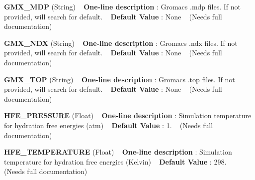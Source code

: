 \begin{DoxyItemize}
\item {\bfseries  G\+M\+X\+\_\+\+M\+DP } (String) ~\newline
{\bfseries  One-\/line description }\+: Gromacs .mdp files. If not provided, will search for default. ~\newline
{\bfseries  Default Value }\+: None ~\newline
(Needs full documentation)\end{DoxyItemize}
\begin{DoxyItemize}
\item {\bfseries  G\+M\+X\+\_\+\+N\+DX } (String) ~\newline
{\bfseries  One-\/line description }\+: Gromacs .ndx files. If not provided, will search for default. ~\newline
{\bfseries  Default Value }\+: None ~\newline
(Needs full documentation)\end{DoxyItemize}
\begin{DoxyItemize}
\item {\bfseries  G\+M\+X\+\_\+\+T\+OP } (String) ~\newline
{\bfseries  One-\/line description }\+: Gromacs .top files. If not provided, will search for default. ~\newline
{\bfseries  Default Value }\+: None ~\newline
(Needs full documentation)\end{DoxyItemize}
\begin{DoxyItemize}
\item {\bfseries  H\+F\+E\+\_\+\+P\+R\+E\+S\+S\+U\+RE } (Float) ~\newline
{\bfseries  One-\/line description }\+: Simulation temperature for hydration free energies (atm) ~\newline
{\bfseries  Default Value }\+: 1. ~\newline
(Needs full documentation)\end{DoxyItemize}
\begin{DoxyItemize}
\item {\bfseries  H\+F\+E\+\_\+\+T\+E\+M\+P\+E\+R\+A\+T\+U\+RE } (Float) ~\newline
{\bfseries  One-\/line description }\+: Simulation temperature for hydration free energies (Kelvin) ~\newline
{\bfseries  Default Value }\+: 298. ~\newline
(Needs full documentation)\end{DoxyItemize}
